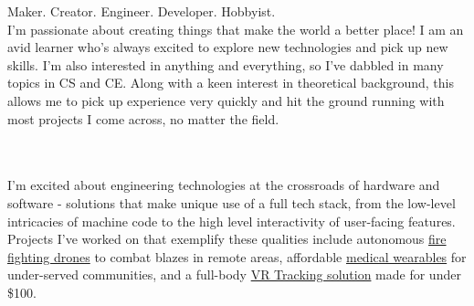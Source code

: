 \documentclass[9pt]{developercv} %
\begin{document}
\vspace{0.5em}

\begin{minipage}[t]{0.45\textwidth} %
	\vspace{-\baselineskip} %
	\large Maker. Creator. Engineer. Developer. Hobbyist.
	\\

	\normalsize
	I'm passionate about creating things that make the world a better place!
	I am an avid learner who's always excited to explore new technologies and pick up new skills.
	I'm also interested in anything and everything, so I've dabbled in many topics in CS and CE.
	Along with a keen interest in theoretical background, this allows me to pick up experience very quickly and hit the ground running with most projects I come across, no matter the field.
\end{minipage}
\hfill %
\begin{minipage}[t]{0.5\textwidth} %
	\vspace{-3\baselineskip} %
	\begin{center}  \end{center}
	\begin{barchart}{5.5}
	\end{barchart}
\end{minipage}
\\
\\
I'm excited about engineering technologies at the crossroads of hardware and software - solutions that make unique use of a full tech stack, from the low-level intricacies of machine code to the high level interactivity of user-facing features.
Projects I've worked on that exemplify these qualities include
autonomous \href{https://devpost.com/software/phoenix-3nzy29}{fire fighting drones} to combat blazes in remote areas,
affordable \href{https://github.com/Cosmic-Goat/ViKi}{medical wearables} for under-served communities,
and a full-body \href{https://github.com/Cosmic-Goat/Track-O-Tron}{VR Tracking solution} made for under \$100.

\hfill

\vspace{1em}
\vspace{-2em}
\end{document}

